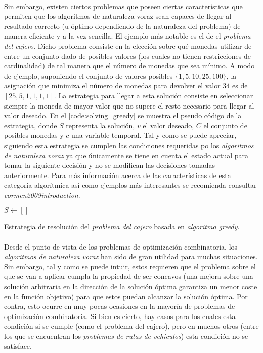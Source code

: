 \documentclass{subfiles}
\begin{document}
        \paragraph{}
        Sin embargo, existen ciertos problemas que poseen ciertas características que permiten que los algoritmos de naturaleza voraz sean capaces de llegar al resultado correcto (u óptimo dependiendo de la naturaleza del problema) de manera eficiente y a la vez sencilla. El ejemplo más notable es el de el \emph{problema del cajero}. Dicho problema consiste en la elección sobre qué monedas utilizar de entre un conjunto dado de posibles valores (los cuales no tienen restricciones de cardinalidad) de tal manera que el número de monedas que sea mínimo. A modo de ejemplo, suponiendo el conjunto de valores posibles $\{1,5,10, 25, 100\}$, la asignación que minimiza el número de monedas para devolver el valor $34$ es de $[25, 5, 1, 1, 1, 1]$. La estrategia para llegar a esta solución consiste en seleccionar siempre la moneda de mayor valor que no supere el resto necesario para llegar al valor deseado. En el \cref{code:solving_greedy} se muestra el pseudo código de la estrategia, donde $S$ representa la solución, $v$ el valor deseado, $C$ el conjunto de posibles monedas y $c$ una variable temporal. Tal y como se puede apreciar, siguiendo esta estrategia se cumplen las condiciones requeridas po los \emph{algoritmos de naturaleza voraz} ya que únicamente se tiene en cuenta el estado actual para tomar la siguiente decisión y no se modifican las decisiones tomadas anteriormente. Para más información acerca de las características de esta categoría algorítmica así como ejemplos más interesantes se recomienda consultar \emph{cormen2009introduction}.

        \begin{algorithm}[ht]
          \SetAlgoLined
          $S \gets [] $\;
          \caption{Estrategia de resolución del \emph{problema del cajero} basada en \emph{algoritmo greedy}.}
          \label{code:solving_greedy}
        \end{algorithm}

        \paragraph{}
        Desde el punto de vista de los problemas de optimización combinatoria, los \emph{algoritmos de naturaleza voraz} han sido de gran utilidad para muchas situaciones. Sin embargo, tal y como se puede intuir, estos requieren que el problema sobre el que se van a aplicar cumpla la propiedad de ser concavos (una mejora sobre una solución arbitraria en la dirección de la solución óptima garantiza un menor coste en la función objetivo) para que estos puedan alcanzar la solución óptima. Por contra, esto ocurre en muy pocas ocasiones en la mayoría de problemas de optimización combinatoria. Si bien es cierto, hay casos para los cuales esta condición si se cumple (como el problema del cajero), pero en muchos otros (entre los que se encuentran los \emph{problemas de rutas de vehículos}) esta condición no se satisface.  
\end{document}
